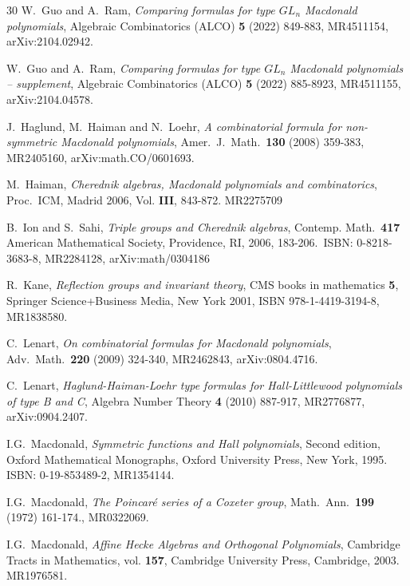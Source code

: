\documentclass[11pt]{article}
\theoremstyle{plain}
\theoremstyle{definition}
\theoremstyle{remark}
\numberwithin{equation}{section}
\newcounter{r}
\newcounter{s}
\begin{document}
\begin{thebibliography}{30}
  W.\ Guo and A.\ Ram,
 \emph{Comparing formulas for type $GL_n$ Macdonald polynomials}, 
 Algebraic Combinatorics (ALCO)  \textbf{5} (2022) 849-883, MR4511154,
 arXiv:2104.02942.

  W.\ Guo and A.\ Ram,
 \emph{Comparing formulas for type $GL_n$ Macdonald polynomials -- supplement}, 
 Algebraic Combinatorics (ALCO)  \textbf{5} (2022) 885-8923, MR4511155,
 arXiv:2104.04578.


  J.\ Haglund, M.\ Haiman and N.\ Loehr,
 \emph{A combinatorial formula for non-symmetric Macdonald polynomials},
 Amer.\ J.\ Math.\ \textbf{130} (2008) 359-383, MR2405160, arXiv:math.CO/0601693.

  M.\ Haiman, 
 \emph{Cherednik algebras, Macdonald polynomials and combinatorics},
 Proc.\  ICM, Madrid 2006, Vol. \textbf{III}, 843-872. 
 MR2275709 
 


  B.\ Ion and S.\ Sahi, \emph{Triple groups and Cherednik algebras},
 Contemp. Math.\  \textbf{417} American Mathematical Society, Providence, RI, 2006, 183-206.\ 
 ISBN: 0-8218-3683-8, MR2284128, arXiv:math/0304186


 
  R.\ Kane, {\em Reflection groups and invariant theory}, CMS books in mathematics \textbf{5},
 Springer Science+Business Media, New York 2001, ISBN 978-1-4419-3194-8, MR1838580.



  C.\ Lenart, \emph{On combinatorial formulas for Macdonald polynomials},
 Adv.\ Math.\ \textbf{220} (2009)  324-340, MR2462843, arXiv:0804.4716.


  C.\ Lenart, 
 \emph{Haglund-Haiman-Loehr type formulas for Hall-Littlewood polynomials of type B and C}, 
 Algebra Number Theory \textbf{4} (2010) 887-917, MR2776877, arXiv:0904.2407.



  I.G.\ Macdonald, 
 \textsl{Symmetric functions and Hall polynomials}, 
 Second edition, Oxford Mathematical Monographs, Oxford University Press, New York, 1995. 
 ISBN: 0-19-853489-2, MR1354144.

  I.G.\ Macdonald,
 \emph{The Poincar\'e series of a Coxeter group},
 Math.\ Ann.\ \textbf{199} (1972) 161-174., MR0322069.
 

  I.G.\ Macdonald,  {\sl Affine Hecke Algebras and Orthogonal Polynomials}, 
 Cambridge Tracts in Mathematics, vol. \textbf{157}, Cambridge University Press, Cambridge, 2003. 
 MR1976581.





\end{thebibliography}
\end{document}
